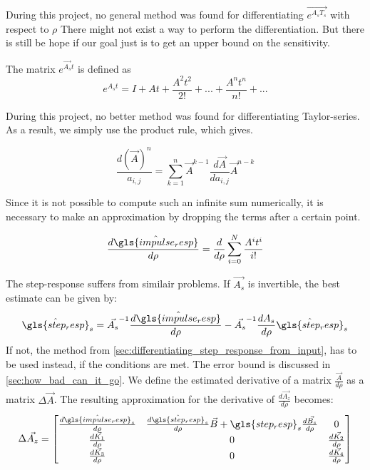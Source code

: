 During this project, no general method was found for differentiating $\Vec{e^{A_s T_s}}$ with respect to $\rho$
There might not exist a way to perform the differentiation. But there is still be hope if our goal just is to get an upper bound on the sensitivity. 

\noindent 


The matrix $e^{\Vec{A_s} t}$ is defined as 
\begin{equation}
 e^{A_s t} = I + At + \frac{A^2 t^2}{2!} + ... + \frac{A^n t^n}{n!} + ...
\end{equation}{}

During this project, no better method was found for differentiating Taylor-series. As a result, we simply use the product rule, which gives. 

\begin{equation}
 \frac{d (\Vec{A})^n}{a_{i,j}} = \sum_{k=1}^{n}\Vec{A}^{k-1} \frac{d \Vec{A}}{d a_{i,j}} \Vec{A}^{n-k}
\end{equation}{}

Since it is not possible to compute such an infinite sum numerically, it is necessary to make an approximation by dropping the terms after a certain point.

\begin{equation}
 \frac{d\hat{\gls{impulse_resp}}}{d\rho} = \frac{d}{d \rho} \sum_{i=0}^{N} \frac{A^i t^i}{i!}
\end{equation}

The step-response suffers from similair problems. If $\Vec{A_s}$ is invertible, the best estimate can be given by: 
\begin{dmath}
 \hat{\gls{step_resp}}_s = \Vec{A_s}^{-1}\frac{d\hat{\gls{impulse_resp}}}{d\rho} - \Vec{A_s}^{-1}\frac{d A_s}{d\rho}\hat{\gls{step_resp}}_s
\end{dmath}
If not, the method from \cref{sec:differentiating_step_response_from_input}, has to be used instead, if the conditions are met.
The error bound is discussed in \cref{sec:how_bad_can_it_go}. We define the estimated derivative of a matrix $\frac{\Vec{A}}{d \rho}$ as a matrix $\Delta \Vec{A}$. The resulting approximation for the derivative of $\frac{d \Vec{A_z}}{d \rho}$ becomes: 
\begin{equation}
 \Delta\Vec{A_z} = 
 \begin{bmatrix} 
 \frac{d \hat{\gls{impulse_resp}}_s}{d \rho} & \frac{d \hat{\gls{step_resp}}_s}{d \rho}\Vec{B} + \gls{step_resp}_s\frac{d \Vec{B_s}}{d \rho} & 0\\
 \frac{d \Vec{K_1}}{d \rho} & 0 & \frac{d \Vec{K_2}}{d \rho}\\
 \frac{d \Vec{K_3}}{d \rho} & 0 & \frac{d \Vec{K_4}}{d \rho}
 \end{bmatrix}
 \label{eq:approx_dA_z}
\end{equation}{}


